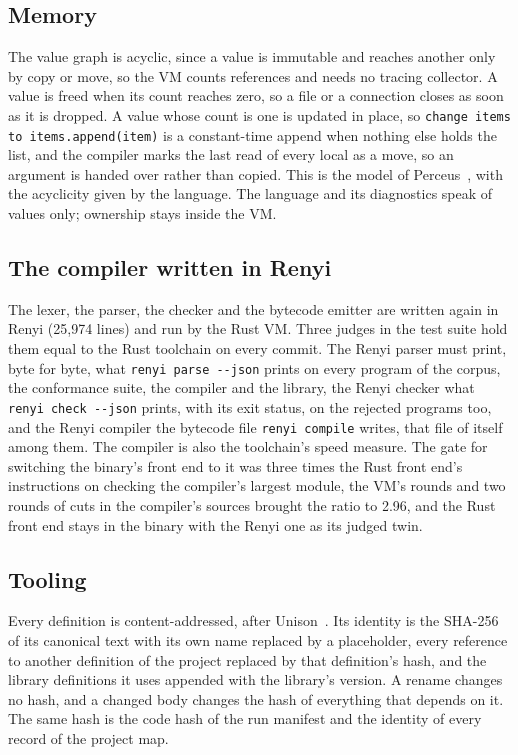 \documentclass[11pt]{article}
\begin{document}
\subsection{Memory}
\label{sec:memory}

The value graph is acyclic, since a value is immutable and reaches
another only by copy or move, so the VM counts references and needs no
tracing collector. A value is freed when its count reaches zero, so a
file or a connection closes as soon as it is dropped. A value whose
count is one is updated in place, so \texttt{change items to
items.append(item)} is a constant-time append when nothing else holds
the list, and the compiler marks the last read of every local as a
move, so an argument is handed over rather than copied. This is the
model of Perceus~\citep{reinking2021perceus}, with the acyclicity given
by the language. The language and its diagnostics speak of values
only; ownership stays inside the VM.

\subsection{The compiler written in Renyi}

The lexer, the parser, the checker and the bytecode emitter are
written again in Renyi (25,974 lines) and run by the Rust VM. Three
judges in the test suite hold them equal to the Rust toolchain on every
commit. The Renyi parser must print, byte for byte, what \texttt{renyi
parse -{}-json} prints on every program of the corpus, the conformance
suite, the compiler and the library, the Renyi checker what
\texttt{renyi check -{}-json} prints, with its exit status, on the
rejected programs too, and the Renyi compiler the bytecode file
\texttt{renyi compile} writes, that file of itself among them. The
compiler is also the toolchain's speed measure. The gate for switching
the binary's front end to it was three times the Rust front end's
instructions on checking the compiler's largest module, the VM's rounds
and two rounds of cuts in the compiler's sources brought the ratio to
2.96, and the Rust front end stays in the binary with the Renyi one as
its judged twin.

\subsection{Tooling}
\label{sec:identity}

Every definition is content-addressed, after Unison~\citep{unison}. Its
identity is the SHA-256 of its canonical text with its own name
replaced by a placeholder, every reference to another definition of the
project replaced by that definition's hash, and the library definitions
it uses appended with the library's version. A rename changes no hash,
and a changed body changes the hash of everything that depends on it.
The same hash is the code hash of the run manifest and the identity of
every record of the project map.
\end{document}
